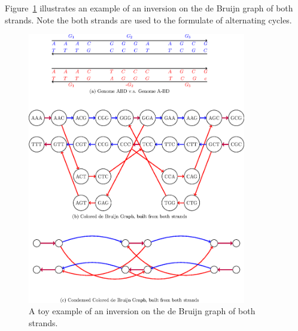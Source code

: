 \documentclass[12pt]{article}
\begin{document}
Figure~\ref{inversion} illustrates an example of an inversion on the de Bruijn graph of both strands.
Note the both strands are used to the formulate of alternating cycles.
\begin{figure}[H]
\begin{center}
\includegraphics[width=0.85\textwidth]{inversion.eps}
\caption{A toy example of an inversion on the de Bruijn graph of both strands.}
\label{inversion}
\end{center}
\end{figure}

\newpage{}
\end{document}
